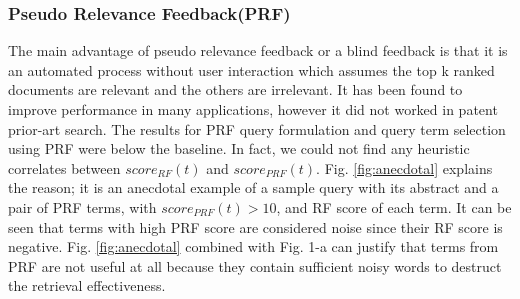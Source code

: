 \documentclass{sig-alternate}
\begin{document}
\subsubsection{Pseudo Relevance Feedback(PRF)}
The main advantage of pseudo relevance feedback or a blind feedback is that it is an automated process without user interaction which assumes the top k ranked documents are relevant and the others are irrelevant. It has been found to improve performance in many applications, however it did not worked in patent prior-art search. The results for PRF query formulation and query term selection using PRF were below the baseline. In fact, we could not find any heuristic correlates between  $ score_{RF}(t)$ and $ score_{PRF}(t)$. Fig. \ref{fig:anecdotal} explains the reason; it is an anecdotal example of a sample query with its abstract and a pair of PRF terms, with $ score_{PRF}(t)>10 $, and RF score of each term. It can be seen that terms with high PRF score are considered noise since their RF score is negative. Fig. \ref{fig:anecdotal} combined with Fig. 1-a can justify that terms from PRF are not useful at all because they contain sufficient noisy words to destruct the retrieval effectiveness. 
\end{document}
